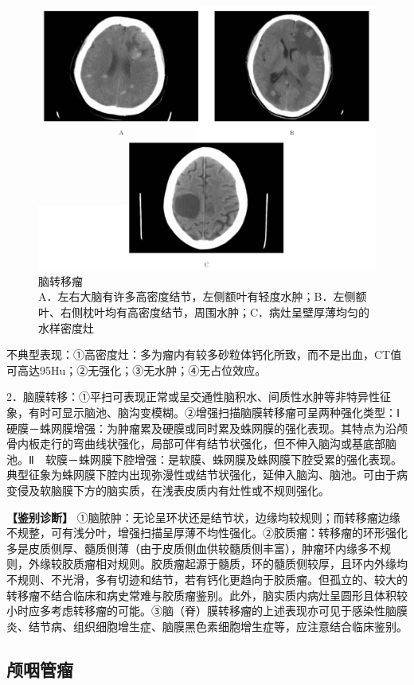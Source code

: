 \begin{figure}[!htbp]
 \centering
 \includegraphics[width=.7\textwidth,height=\textheight,keepaspectratio]{./images/Image00074.jpg}
 \captionsetup{justification=centering}
 \caption{脑转移瘤\\{\small A．左右大脑有许多高密度结节，左侧额叶有轻度水肿；B．左侧额叶、右侧枕叶均有高密度结节，周围水肿；C．病灶呈壁厚薄均匀的水样密度灶}}
 \label{fig2-45}
  \end{figure} 

不典型表现：①高密度灶：多为瘤内有较多砂粒体钙化所致，而不是出血，CT值可高达95Hu；②无强化；③无水肿；④无占位效应。

2．脑膜转移：①平扫可表现正常或呈交通性脑积水、间质性水肿等非特异性征象，有时可显示脑池、脑沟变模糊。②增强扫描脑膜转移瘤可呈两种强化类型：Ⅰ　硬膜－蛛网膜增强：为肿瘤累及硬膜或同时累及蛛网膜的强化表现。其特点为沿颅骨内板走行的弯曲线状强化，局部可伴有结节状强化，但不伸入脑沟或基底部脑池。Ⅱ　软膜－蛛网膜下腔增强：是软膜、蛛网膜及蛛网膜下腔受累的强化表现。典型征象为蛛网膜下腔内出现弥漫性或结节状强化，延伸入脑沟、脑池。可由于病变侵及软脑膜下方的脑实质，在浅表皮质内有灶性或不规则强化。

\textbf{【鉴别诊断】}
①脑脓肿：无论呈环状还是结节状，边缘均较规则；而转移瘤边缘不规整，可有浅分叶，增强扫描呈厚薄不均性强化。②胶质瘤：转移瘤的环形强化多是皮质侧厚、髓质侧薄（由于皮质侧血供较髓质侧丰富），肿瘤环内缘多不规则，外缘较胶质瘤相对规则。胶质瘤起源于髓质，环的髓质侧较厚，且环内外缘均不规则、不光滑，多有切迹和结节，若有钙化更趋向于胶质瘤。但孤立的、较大的转移瘤不结合临床和病史常难与胶质瘤鉴别。此外，脑实质内病灶呈圆形且体积较小时应多考虑转移瘤的可能。③脑（脊）膜转移瘤的上述表现亦可见于感染性脑膜炎、结节病、组织细胞增生症、脑膜黑色素细胞增生症等，应注意结合临床鉴别。

\subsection{颅咽管瘤}


